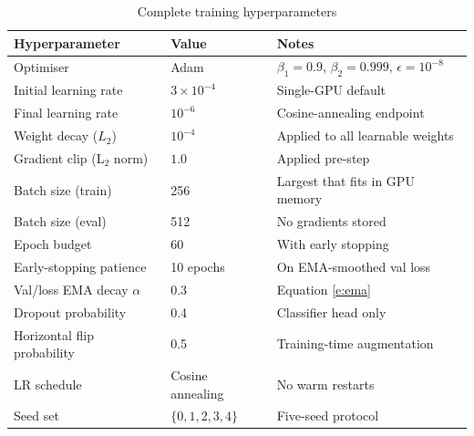 \documentclass[letterpaper,11pt,leqno]{article}
\begin{document}
\begin{table}[t]
\caption{Complete training hyperparameters}
\begin{tabular*}{\textwidth}[]{p{5cm}@{\extracolsep\fill}lp{6cm}}
\toprule
Hyperparameter                     & Value                    & Notes                                                         \\
\midrule
Optimiser                          & Adam                     & $\beta_1=0.9$, $\beta_2=0.999$, $\epsilon=10^{-8}$             \\
Initial learning rate              & $3\times 10^{-4}$        & Single-GPU default                                            \\
Final learning rate                & $10^{-6}$                & Cosine-annealing endpoint                                     \\
Weight decay ($L_2$)               & $10^{-4}$                & Applied to all learnable weights                              \\
Gradient clip (L$_2$ norm)         & $1.0$                    & Applied pre-step                                              \\
Batch size (train)                 & 256                      & Largest that fits in GPU memory                               \\
Batch size (eval)                  & 512                      & No gradients stored                                           \\
Epoch budget                       & 60                       & With early stopping                                           \\
Early-stopping patience            & 10 epochs                & On EMA-smoothed val loss                                      \\
Val/loss EMA decay $\alpha$        & 0.3                      & Equation \eqref{e:ema}                                         \\
Dropout probability                & 0.4                      & Classifier head only                                          \\
Horizontal flip probability        & 0.5                      & Training-time augmentation                                    \\
LR schedule                        & Cosine annealing         & No warm restarts                                              \\
Seed set                           & $\{0, 1, 2, 3, 4\}$      & Five-seed protocol                                            \\

\end{tabular*}
\end{table}
\end{document}
